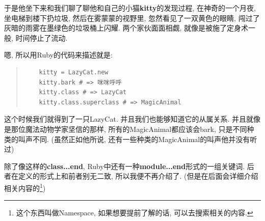 于是他坐下来和我们聊了聊他和自己的小猫\textbf{kitty}的发现过程, 在神奇的一个月夜, 坐电梯到楼下扔垃圾, 然后在雾蒙蒙的视野里, 忽然看见了一双黄色的眼睛, 闯过了灰暗的雨雾在墨绿色的垃圾桶上闪耀. 两个家伙面面相觑, 就像是被施了定身术一般, 时间停止了流动. 

嗯, 所以用Ruby的代码来描述就是: 

\begin{quotation}
  \begin{verbatim}
    kitty = LazyCat.new
    kitty.bark # => 咪咪呼呼
    kitty.class # => LazyCat
    kitty.class.superclass # => MagicAnimal
  \end{verbatim}
\end{quotation}

这个时候我们就得到了一只LazyCat. 并且我们也能够知道它的从属关系. 并且就像是那位魔法动物学家坚信的那样, 所有的MagicAnimal都应该会bark, 只是不同种类的叫声不同. (虽然正如他所说, 还有一些种类的MagicAnimal的叫声他并没有听过)

除了像这样的\textbf{class...end}, Ruby中还有一种\textbf{module...end}形式的一组关键词. 后者在定义的形式上和前者别无二致, 所以我便不再介绍了. (但是在后面会详细介绍相关内容的\footnote{这个东西叫做Namespace, 如果想要提前了解的话, 可以去搜索相关的内容. })

